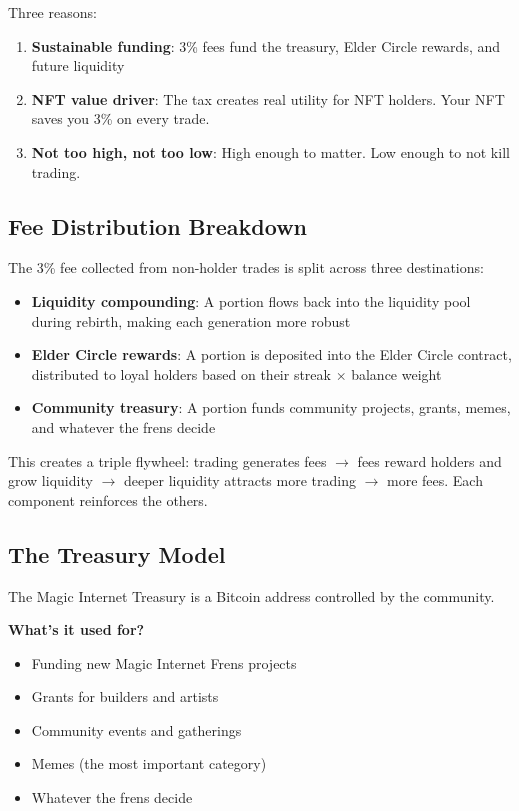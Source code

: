 \documentclass[11pt,a4paper]{article}
\begin{document}
Three reasons:

\begin{enumerate}
    \item \textbf{Sustainable funding}: 3\% fees fund the treasury, Elder Circle rewards, and future liquidity
    \item \textbf{NFT value driver}: The tax creates real utility for NFT holders. Your NFT saves you 3\% on every trade.
    \item \textbf{Not too high, not too low}: High enough to matter. Low enough to not kill trading.
\end{enumerate}

\subsection{Fee Distribution Breakdown}

The 3\% fee collected from non-holder trades is split across three destinations:

\begin{itemize}
    \item \textbf{Liquidity compounding}: A portion flows back into the liquidity pool during rebirth, making each generation more robust
    \item \textbf{Elder Circle rewards}: A portion is deposited into the Elder Circle contract, distributed to loyal holders based on their streak $\times$ balance weight
    \item \textbf{Community treasury}: A portion funds community projects, grants, memes, and whatever the frens decide
\end{itemize}

This creates a triple flywheel: trading generates fees $\rightarrow$ fees reward holders and grow liquidity $\rightarrow$ deeper liquidity attracts more trading $\rightarrow$ more fees. Each component reinforces the others.

\subsection{The Treasury Model}

The Magic Internet Treasury is a Bitcoin address controlled by the community.

\textbf{What's it used for?}
\begin{itemize}
    \item Funding new Magic Internet Frens projects
    \item Grants for builders and artists
    \item Community events and gatherings
    \item Memes (the most important category)
    \item Whatever the frens decide
\end{itemize}
\end{document}
